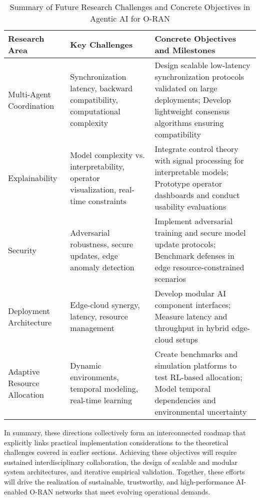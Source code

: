 \documentclass[sigconf]{acmart}
\begin{document}
\begin{table*}[htbp]
\centering
\caption{Summary of Future Research Challenges and Concrete Objectives in Agentic AI for O-RAN}
\label{tab:future_challenges}
\begin{adjustbox}{max width=\textwidth}
\begin{tabular}{@{}lll@{}}
\toprule
\textbf{Research Area} & \textbf{Key Challenges} & \textbf{Concrete Objectives and Milestones} \\
\midrule
Multi-Agent Coordination & Synchronization latency, backward compatibility, computational complexity & Design scalable low-latency synchronization protocols validated on large deployments; Develop lightweight consensus algorithms ensuring compatibility~\cite{ref21} \\
Explainability & Model complexity vs. interpretability, operator visualization, real-time constraints & Integrate control theory with signal processing for interpretable models; Prototype operator dashboards and conduct usability evaluations~\cite{ref48} \\
Security & Adversarial robustness, secure updates, edge anomaly detection & Implement adversarial training and secure model update protocols; Benchmark defenses in edge resource-constrained scenarios~\cite{ref50} \\
Deployment Architecture & Edge-cloud synergy, latency, resource management & Develop modular AI component interfaces; Measure latency and throughput in hybrid edge-cloud setups~\cite{ref50} \\
Adaptive Resource Allocation & Dynamic environments, temporal modeling, real-time learning & Create benchmarks and simulation platforms to test RL-based allocation; Model temporal dependencies and environmental uncertainty~\cite{ref21} \\
\bottomrule
\end{tabular}
\end{adjustbox}
\end{table*}

In summary, these directions collectively form an interconnected roadmap that explicitly links practical implementation considerations to the theoretical challenges covered in earlier sections. Achieving these objectives will require sustained interdisciplinary collaboration, the design of scalable and modular system architectures, and iterative empirical validation. Together, these efforts will drive the realization of sustainable, trustworthy, and high-performance AI-enabled O-RAN networks that meet evolving operational demands.
\end{document}
